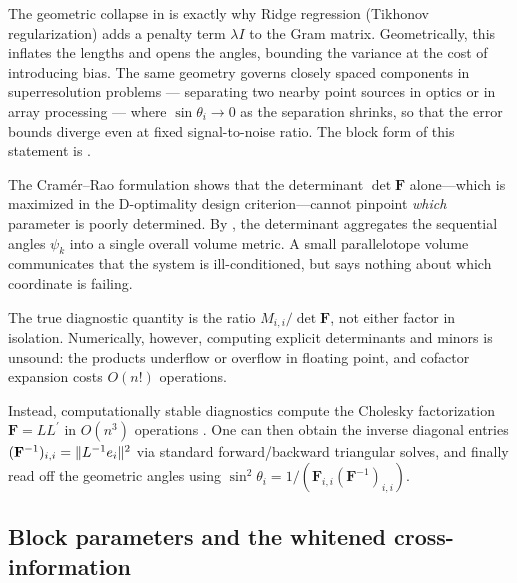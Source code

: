 \documentclass{IEEEtran}
\begin{document}
\begin{remark}
  \label{rem:regularization}
  The geometric collapse in  is exactly why Ridge regression (Tikhonov regularization) adds a penalty term $\lambda I$ to the Gram matrix. Geometrically, this inflates the lengths and opens the angles, bounding the variance at the cost of introducing bias. The same geometry governs closely spaced components in superresolution problems --- separating two nearby point sources in optics or in array processing \cite{stoica1989} --- where $\sin\theta_{i} \to 0$ as the separation shrinks, so that the error bounds diverge even at fixed signal-to-noise ratio. The block form of this statement is .
\end{remark}

\begin{remark}
  \label{rem:diagnostics}
  The Cram\'er--Rao formulation shows that the determinant $\det\mathbf{F}$ alone---which is maximized in the D-optimality design criterion---cannot pinpoint \emph{which} parameter is poorly determined. By , the determinant aggregates the sequential angles $\psi_{k}$ into a single overall volume metric. A small parallelotope volume communicates that the system is ill-conditioned, but says nothing about which coordinate is failing.

  The true diagnostic quantity is the ratio $M_{i,i}/\det\mathbf{F}$, not either factor in isolation. Numerically, however, computing explicit determinants and minors is unsound: the products underflow or overflow in floating point, and cofactor expansion costs $O(n!)$ operations.

  Instead, computationally stable diagnostics compute the Cholesky factorization $\mathbf{F} = LL^{\prime}$ in $O(n^{3})$ operations \cite{golub2013}. One can then obtain the inverse diagonal entries $(\mathbf{F}^{-1})_{i,i} = \lVert L^{-1}e_{i}\rVert^{2}$ via standard forward/backward triangular solves, and finally read off the geometric angles using $\sin^{2}\theta_{i} = 1/(\mathbf{F}_{i,i}(\mathbf{F}^{-1})_{i,i})$.
\end{remark}

\subsection{Block parameters and the whitened cross-information}
\label{subsec:principal-angles-block}
\end{document}
